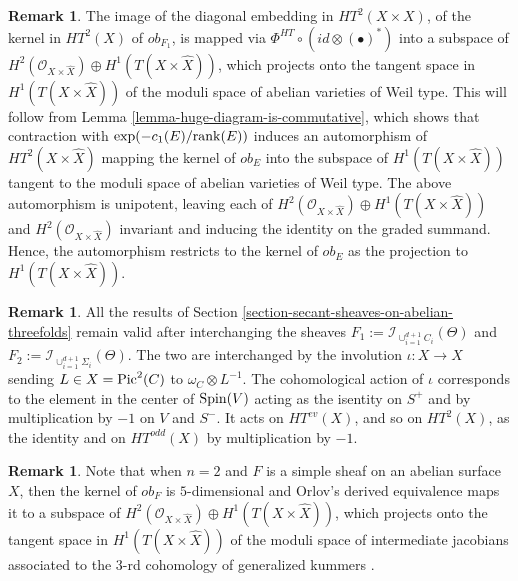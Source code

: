 \documentclass[12pt]{amsart}
\numberwithin{equation}{subsection}
\theoremstyle{plain}
\theoremstyle{definition}
\newtheorem{rem}[thm]{Remark}
\newcommand{\Spin}{{\rm Spin}}
\newcommand{\StructureSheaf}[1]{{\mathcal O}_{#1}}
\newcommand{\rank}{{\rm rank}}
\newcommand{\Pic}{{\rm Pic}}
\newcommand{\Ideal}[1]{{\mathcal I}_{#1}}
\begin{document}
\begin{rem}
The image of the diagonal embedding in $HT^2(X\times X)$, of the kernel in $HT^2(X)$  of $ob_{F_1}$, is mapped via $\Phi^{HT}\circ(id\otimes(\bullet)^*)$ into a subspace of $H^2(\StructureSheaf{X\times\hat{X}})\oplus H^1(T(X\times\hat{X}))$, which projects onto the tangent space in $H^1(T(X\times\hat{X}))$ of the moduli space of abelian varieties of Weil type. This will follow from Lemma \ref{lemma-huge-diagram-is-commutative}, which shows that contraction with $\exp(-c_1(E)/\rank(E))$ induces an automorphism of $HT^2(X\times\hat{X})$ mapping the kernel of $ob_E$ into the subspace of $H^1(T(X\times\hat{X}))$ tangent to the moduli space of abelian varieties of Weil type. The above automorphism is unipotent, leaving each of $H^2(\StructureSheaf{X\times\hat{X}})\oplus H^1(T(X\times\hat{X}))$ and $H^2(\StructureSheaf{X\times\hat{X}})$ invariant and inducing the identity on the graded summand. Hence, the automorphism restricts to the kernel of $ob_E$ as the projection to $H^1(T(X\times\hat{X}))$.
\end{rem}

\begin{rem}
\label{rem-interchanging-F-1-and-F-2}
All the results of Section \ref{section-secant-sheaves-on-abelian-threefolds} remain valid after interchanging the sheaves $F_1:=\Ideal{\cup_{i=1}^{d+1}C_i}(\Theta)$ and $F_2:=\Ideal{\cup_{i=1}^{d+1}\Sigma_i}(\Theta).$ The two are interchanged by the involution $\iota:X\rightarrow X$ sending $L\in X=\Pic^2(C)$ to $\omega_C\otimes L^{-1}$. The cohomological action of $\iota$ corresponds to the element in the center of $\Spin(V)$ acting as the isentity on $S^+$ and by multiplication by $-1$ on $V$ and $S^-$. It acts on $HT^{ev}(X)$, and so on $HT^2(X)$,  as the identity and on $HT^{odd}(X)$ by multiplication by $-1$.  
\end{rem}



\begin{rem}
Note that when $n=2$ and $F$ is a simple sheaf on an abelian surface $X$, then the kernel of $ob_F$ is $5$-dimensional and Orlov's derived equivalence maps it to a subspace of $H^2(\StructureSheaf{X\times\hat{X}})\oplus H^1(T(X\times\hat{X}))$, which projects onto the tangent space in $H^1(T(X\times\hat{X}))$ of the moduli space of intermediate jacobians associated to the $3$-rd cohomology of generalized kummers \cite{markman-generalized-kummers}.
\end{rem}

% 
\end{document}

